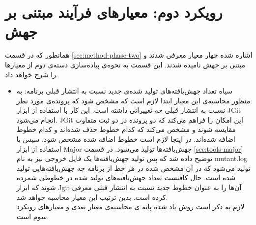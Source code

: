 \section{رویکرد دوم: معیارهای فرآیند مبتنی بر جهش}
همانطور که در قسمت \ref{sec:method-phase-two} اشاره شده چهار معیار معرفی شدند و مبتنی بر جهش نامیده شدند. این قسمت به نحوه‌ی پیاده‌سازی دسته‌ی دوم از معیارها را شرح خواهد داد. 
\begin{itemize}
\item
{}‌سیاه{	تعداد جهش‌یافته‌های تولید شده‌ی جدید نسبت به انتشار قبلی برنامه:}
به منظور محاسبه‌ی این معیار ابتدا لازم است که مشخص شود که پرونده‌ی مورد نظر نسبت به انتشار قبلی چه تغییراتی داشته است. این کار با استفاده از ابزار JGit انجام  می‌شود. JGit این امکان را فراهم می‌کند که دو پرونده در دو ثبت متفاوت مقایسه شوند و مشخص می‌کند که کدام خطوط حذف شده‌اند و کدام خطوط اضافه شده‌اند. در اینجا لازم است خطوط اضافه شده  مشخص شود. سپس با استفاده از ابزار Major جهش‌یافته‌ها تولید می‌شود. در  قسمت  \ref{sec:tools-major} توضیح داده شد که پس تولید جهش‌یافته‌ها یک فایل خروجی نیز به نام mutant.log تولید می‌شود که در آن مشخص شده در هر خط از برنامه چه جهش‌یافته‌هایی تولید شده است. حال کافیست تعداد جهش‌یافته‌های تولید شده در خطوطی شمرده شوند که ابزار Jgit آن‌ها را به عنوان خطوط جدید نسبت به انتشار قبلی معرفی کرده است. بدین ترتیب این معیار محاسبه خواهد شد.\\
لازم به ذکر است روش یاد شده پایه ی محاسبه‌ی معیار بعدی و معیارهای رویکرد سوم است.
\end{itemize}
